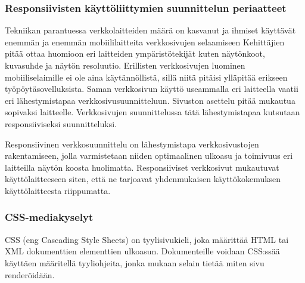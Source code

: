 \documentclass[11pt,a4paper,titlepage,oneside]{article}
\begin{document}



\subsubsection{Responsiivisten käyttöliittymien suunnittelun periaatteet}




Tekniikan parantuessa verkkolaitteiden määrä on kasvanut ja ihmiset käyttävät enemmän ja enemmän mobiililaitteita verkkosivujen selaamiseen
Kehittäjien pitää ottaa huomioon eri laitteiden ympäristötekijät kuten näytönkoot, kuvasuhde ja näytön resoluutio.
Erillisten verkkosivujen luominen mobiiliselaimille ei ole aina käytännöllistä, sillä niitä pitäisi ylläpitää erikseen työpöytäsovelluksista.
Saman verkkosivun käyttö useammalla eri laitteella vaatii eri lähestymistapaa verkkosivusuunnitteluun. 
Sivuston asettelu pitää mukautua sopivaksi laitteelle.
Verkkosivujen suunnittelussa tätä lähestymistapaa kutsutaan responsiiviseksi suunnitteluksi.
\medskip



Responsiivinen verkkosuunnittelu on lähestymistapa verkkosivustojen rakentamiseen,
jolla varmistetaan niiden optimaalinen ulkoasu ja toimivuus eri laitteilla näytön koosta huolimatta. 
Responsiiviset verkkosivut mukautuvat käyttölaitteeseen siten, että ne tarjoavat yhdenmukaisen käyttökokemuksen käyttölaitteesta riippumatta.
\medskip





\subsubsection{CSS-mediakyselyt}








CSS (eng Cascading Style Sheets) on tyylisivukieli, joka määrittää HTML tai XML dokumenttien elementtien ulkoasun.
Dokumenteille voidaan CSS:ssää käyttäen määritellä tyyliohjeita, jonka mukaan selain tietää miten sivu renderöidään.
\medskip
\end{document}
